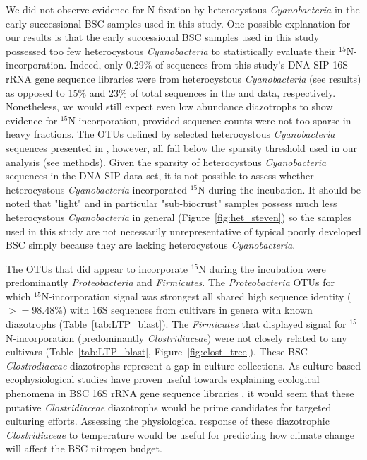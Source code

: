We did not observe evidence for N-fixation by heterocystous
\textit{Cyanobacteria} in the early successional BSC samples used in this
study. One possible explanation for our results is that the early successional
BSC samples used in this study possessed too few heterocystous
\textit{Cyanobacteria} to statistically evaluate their $^{15}$N-incorporation.
Indeed, only 0.29\% of sequences from this study's DNA-SIP 16S rRNA gene
sequence libraries were from heterocystous \textit{Cyanobacteria} (see results)
as opposed to 15\% and 23\% of total sequences in the \citet{Steven_2013} and
\citet{Garcia_Pichel_2013} data, respectively.  Nonetheless, we would still
expect even low abundance diazotrophs to show evidence for
$^{15}$N-incorporation, provided sequence counts were not too sparse in heavy
fractions. The OTUs defined by selected heterocystous \textit{Cyanobacteria}
sequences presented in \citet{Yeager}, however, all fall below the sparsity
threshold used in our analysis (see methods). Given the sparsity of
heterocystous \textit{Cyanobacteria} sequences in the DNA-SIP data set, it is
not possible to assess whether heterocystous \textit{Cyanobacteria}
incorporated $^{15}$N during the incubation. It should be noted that "light"
and in particular "sub-biocrust" samples possess much less heterocystous
\textit{Cyanobacteria} in general (Figure~\ref{fig:het_steven}) so the samples
used in this study are not necessarily unrepresentative of typical poorly
developed BSC simply because they are lacking heterocystous
\textit{Cyanobacteria}. 

The OTUs that did appear to incorporate $^{15}$N during the incubation were
predominantly \textit{Proteobacteria} and \textit{Firmicutes}. The
\textit{Proteobacteria} OTUs for which $^{15}$N-incorporation signal was
strongest all shared high sequence identity ($>=$98.48\%) with 16S sequences
from cultivars in genera with known diazotrophs (Table~\ref{tab:LTP_blast}).
The \textit{Firmicutes} that displayed signal for $^{15}$N-incorporation
(predominantly \textit{Clostridiaceae}) were not closely related to any
cultivars (Table~\ref{tab:LTP_blast}, Figure~\ref{fig:clost_tree}). These BSC
\textit{Clostrodiaceae} diazotrophs represent a gap in culture collections. As
culture-based ecophysiological studies have proven useful towards explaining
ecological phenomena in BSC 16S rRNA gene sequence libraries
\citep{Garcia_Pichel_2013}, it would seem that these putative
\textit{Clostridiaceae} diazotrophs would be prime candidates for targeted
culturing efforts. Assessing the physiological response of these diazotrophic
\textit{Clostridiaceae} to temperature would be useful for predicting how
climate change will affect the BSC nitrogen budget.

